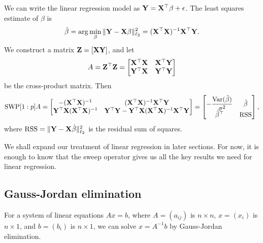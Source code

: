 \documentclass{article}\usepackage[]{graphicx}\usepackage[]{color}
\def\T{{\top}}
\def\Var{{\rm Var}}
\def\S{{\rm SWP}}
\def\X{{\bf X}}
\def\Y{{\bf Y}}
\def\Z{{\bf Z}}
\def\bbeta{\boldmath{\beta}}
\begin{document}
We can write the linear regression model as $\Y = \X^{\T}\bbeta + \epsilon$. The least squares estimate of $\beta$ is 
\[
\hat{\beta} = \arg\min_{\beta} \|\Y - \X\bbeta\|_{\ell_2}^{2} = (\X^{\T}\X)^{-1}\X^{\T}\Y.
\]
We construct a matrix $\Z = [\X  \Y]$, and let 
$$A= \Z^{\T}\Z = \begin{bmatrix} \X^{\T}\X & \X^{\T}\Y \\ \Y^{\T}\X & \Y^{\T}\Y \end{bmatrix}$$ 
be the cross-product matrix. Then 
\[\S[1:p]A = \begin{bmatrix} -(\X^{\T}\X)^{-1} & (\X^{\T}\X)^{-1}\X^{\T}\Y \\ \Y^{\T}\X(\X^{\T}\X)^{-1} & \Y^{\T}\Y - \Y^{\T}\X(\X^{\T}\X)^{-1}\X^{\T}\Y \end{bmatrix} = \begin{bmatrix} -\dfrac{\Var(\hat{\beta})}{\sigma^2} & \hat{\beta} \\ \hat{\beta}^{\T} & \textrm{RSS} \end{bmatrix},\]
where $\textrm{RSS} = \|\Y - \X\hat{\beta}\|_{\ell_2}^2$  is the residual sum of squares. 

We shall expand our treatment of linear regression in later sections. For now, it is enough to know that the sweep operator gives us all the key results we need for linear regression. 


\subsection{Gauss-Jordan elimination} 

For a system of linear equations $A x = b$, where $A = (a_{ij})$ is $n \times n$, $x = (x_i)$ is $n \times 1$, and $b  = (b_i)$ is $n \times 1$, we can solve $x = A^{-1} b$ by Gauss-Jordan elimination. 
\end{document}
